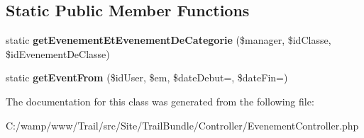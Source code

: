 \subsection*{Static Public Member Functions}
\begin{DoxyCompactItemize}
\item 
\hypertarget{class_site_1_1_trail_bundle_1_1_controller_1_1_evenement_controller_a6f8cfa497af6cc75c4924ec416fdce89}{}static {\bfseries get\+Evenement\+Et\+Evenement\+De\+Categorie} (\$manager, \$id\+Classe, \$id\+Evenement\+De\+Classe)\label{class_site_1_1_trail_bundle_1_1_controller_1_1_evenement_controller_a6f8cfa497af6cc75c4924ec416fdce89}

\item 
\hypertarget{class_site_1_1_trail_bundle_1_1_controller_1_1_evenement_controller_a7993aa04d86318afb0a30244759345c3}{}static {\bfseries get\+Event\+From} (\$id\+User, \$em, \$date\+Debut=\textquotesingle{}\textquotesingle{}, \$date\+Fin=\textquotesingle{}\textquotesingle{})\label{class_site_1_1_trail_bundle_1_1_controller_1_1_evenement_controller_a7993aa04d86318afb0a30244759345c3}

\end{DoxyCompactItemize}


The documentation for this class was generated from the following file\+:\begin{DoxyCompactItemize}
\item 
C\+:/wamp/www/\+Trail/src/\+Site/\+Trail\+Bundle/\+Controller/Evenement\+Controller.\+php\end{DoxyCompactItemize}
